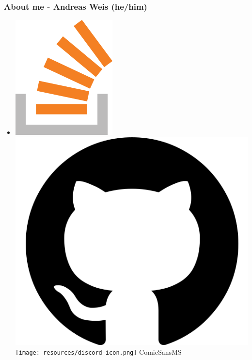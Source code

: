 \documentclass[aspectratio=169]{beamer}
\begin{document}
\begin{frame}[fragile]
  \frametitle{About me - Andreas Weis (he/him)}

  \begin{itemize}
    \setlength\itemsep{1.5em}

    \item \href{https://stackoverflow.com/users/577603/comicsansms}{\includegraphics[height=.05\textheight]{resources/so-icon.png}} \href{https://github.com/ComicSansMS}{\includegraphics[height=.05\textheight]{resources/github-icon.png}} \texttt{[image: resources/discord-icon.png]} ComicSansMS



\end{itemize}
\end{frame}
\end{document}
